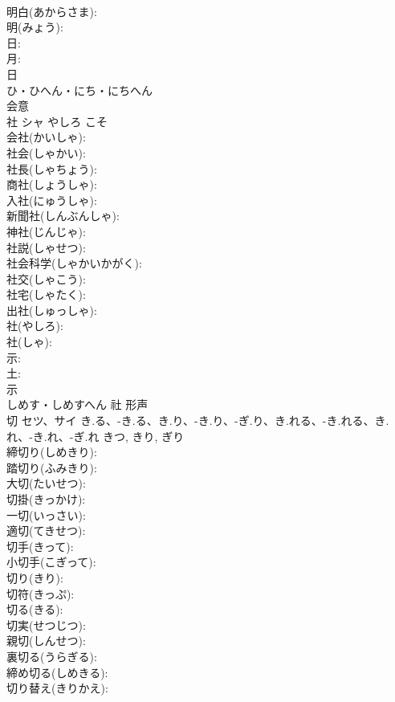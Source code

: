 \documentclass[8pt]{extreport}
\begin{document}
\begin{CJK}{UTF8}{min}
\\	明白(あからさま): 
\\	明(みょう): 
\\	日: 
\\	月: 
\\	日	
\\	ひ・ひへん・にち・にちへん	
\\	会意 
\\	社	シャ	やしろ	こそ	
\\	会社(かいしゃ): 
\\	社会(しゃかい): 
\\	社長(しゃちょう): 
\\	商社(しょうしゃ): 
\\	入社(にゅうしゃ): 
\\	新聞社(しんぶんしゃ): 
\\	神社(じんじゃ): 
\\	社説(しゃせつ): 
\\	社会科学(しゃかいかがく): 
\\	社交(しゃこう): 
\\	社宅(しゃたく): 
\\	出社(しゅっしゃ): 
\\	社(やしろ): 
\\	社(しゃ): 
\\	示: 
\\	土: 
\\	示	
\\	しめす・しめすへん	社	形声 
\\	切	セツ、サイ	き.る、-き.る、き.り、-き.り、-ぎ.り、き.れる、-き.れる、き.れ、-き.れ、-ぎ.れ	きつ, きり, ぎり	
\\	締切り(しめきり): 
\\	踏切り(ふみきり): 
\\	大切(たいせつ): 
\\	切掛(きっかけ): 
\\	一切(いっさい): 
\\	適切(てきせつ): 
\\	切手(きって): 
\\	小切手(こぎって): 
\\	切り(きり): 
\\	切符(きっぷ): 
\\	切る(きる): 
\\	切実(せつじつ): 
\\	親切(しんせつ): 
\\	裏切る(うらぎる): 
\\	締め切る(しめきる): 
\\	切り替え(きりかえ): 

\end{CJK}
\end{document}
